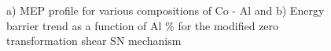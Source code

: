 \documentclass[preprint]{elsarticle}
\begin{document}
\begin{figure}[htp!]%
    \centering
\caption{a) MEP profile for various compositions of Co - Al and b) Energy barrier trend as a function of Al \%  for the modified zero transformation shear SN mechanism}
\label{fig:modified_sn_zero}
  \end{figure}  
\end{document}
